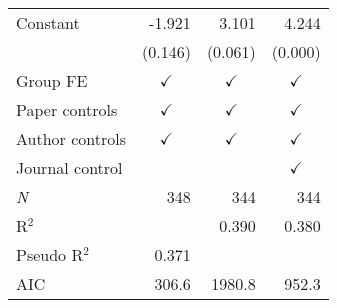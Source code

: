 {\begin{tabular}{l*{3}{D{.}{.}{-1}}}
\addlinespace
Constant            	&         -1.921         	&          3.101\sym{*}  	&          4.244\sym{***}\\
                    	&        (0.146)         	&        (0.061)         	&        (0.000)         \\
\addlinespace
Group FE            	&         	&         	&         \\
\addlinespace
Paper controls      	&         	&         	&         \\
\addlinespace
Author controls     	&         	&         	&         \\
\addlinespace
Journal control     	&                        	&                        	&         \\
\midrule
\textit{N}          	&            348         	&            344         	&            344         \\
R$^{2}$             	&                        	&          0.390         	&          0.380         \\
Pseudo R$^{2}$      	&          0.371         	&                        	&                        \\
AIC                 	&          306.6         	&         1980.8         	&          952.3         \\
\bottomrule
\end{tabular}
}
